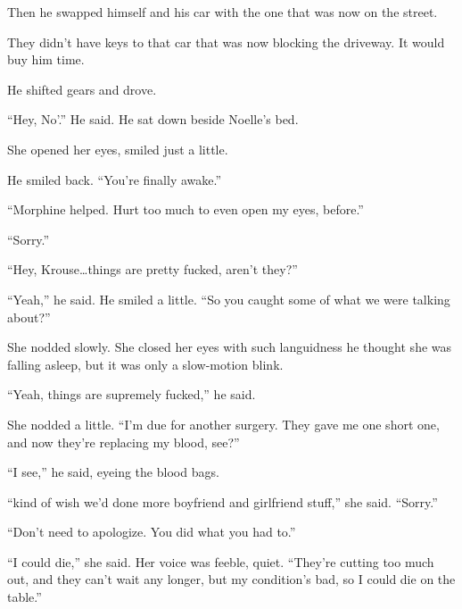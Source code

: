Then he swapped himself and his car with the one that was now on the street.



They didn't have keys to that car that was now blocking the driveway.  It would buy him time.



He shifted gears and drove.



\blacksquare



``Hey, No'.'' He said.  He sat down beside Noelle's bed.



She opened her eyes, smiled just a little.



He smiled back.  ``You're finally awake.''



``Morphine helped.  Hurt too much to even open my eyes, before.''



``Sorry.''



``Hey, Krouse\ldots things are pretty fucked, aren't they?''



``Yeah,'' he said.  He smiled a little.  ``So you caught some of what we were talking about?''



She nodded slowly.  She closed her eyes with such languidness he thought she was falling asleep, but it was only a slow-motion blink.



``Yeah, things are supremely fucked,'' he said.



She nodded a little.  ``I'm due for another surgery.  They gave me one short one, and now they're replacing my blood, see?''



``I see,'' he said, eyeing the blood bags.



``\ldotsI kind of wish we'd done more boyfriend and girlfriend stuff,'' she said.  ``Sorry.''



``Don't need to apologize.  You did what you had to.''



``I could die,'' she said.  Her voice was feeble, quiet.  ``They're cutting too much out, and they can't wait any longer, but my condition's bad, so I could die on the table.''



